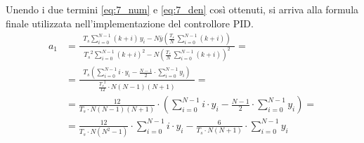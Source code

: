 Unendo i due termini \eqref{eq:7_num} e \eqref{eq:7_den} così ottenuti, si arriva alla formula finale utilizzata
nell'implementazione del controllore PID.
\begin{align}
	a_1 &= \frac{\displaystyle \;\; T_s \sum_{i=0}^{N-1} (k + i) \, y_i - N \bar{y} \left(\frac{T_s}{N} \, \sum_{i=0}^{N-1} (k + i)\right) \;\;}{\displaystyle \;\; {T_s}^2 \sum_{i=0}^{N-1} (k + i)^2 - N \left(\frac{T_s}{N} \,\sum_{i=0}^{N-1} (k + i)\right)^2 \;\;} = \\[5pt]
	&= \frac{\displaystyle \;\; T_s \left( \sum_{i=0}^{N-1} i \cdot y_i - \frac{N-1}{2} \cdot \sum_{i=0}^{N-1} y_i \right) \;\;}{\displaystyle \;\; \frac{{T_s}^2}{12} \cdot N (N-1)(N+1) \;\;} = \\[5pt]
	&= \frac{12}{T_s \cdot N(N-1)(N+1)} \cdot \left( \sum_{i=0}^{N-1} i \cdot y_i - \frac{N-1}{2} \cdot \sum_{i=0}^{N-1} y_i \right) = \\
	&= \frac{12}{T_s \cdot N(N^2-1)} \cdot \sum_{i=0}^{N-1} i \cdot y_i - \frac{6}{T_s \cdot N(N+1)} \cdot \sum_{i=0}^{N-1} y_i
\end{align}


%
%
%
%
%
%
%

